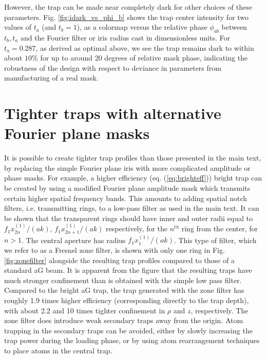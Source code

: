 However, the trap can be made near completely dark for other choices of these parameters. Fig. \ref{fig:idark_vs_phi_b} shows the trap center intensity for two values of $t_a$ (and $t_b=1$), as a colormap versus the relative phase $\phi_{ab}$ between $t_b,t_a$ and the Fourier filter or iris radius cast in dimensionless units. For $t_a=0.287$, as derived as optimal above, we see the trap remains dark to within about $10 \%$ for up to around 20 degrees of relative mask phase, indicating the robustness of the design with respect to deviance in parameters from manufacturing of a real mask.

\section{Tighter traps with alternative Fourier plane masks}\label{sec:tighter}
It is possible to create tighter trap profiles than those presented in the main text, by replacing the simple Fourier plane iris with more complicated amplitude or phase masks. For example, a higher efficiency (eq. (\ref{eq:brighteff})) bright trap can be created by using a modified Fourier plane amplitude mask which transmits certain higher spatial frequency bands. This amounts to adding spatial notch filters, i.e. transmitting rings, to a low-pass filter as used in the main text. It can be shown that the transparent rings should have inner and outer radii equal to $f_1 x_{2n}^{(1)}/(ak)$, $f_1 x_{2n+1}^{(1)}/(ak)$ respectively, for the $n^{th}$ ring from the center, for $n>1$. The central aperture has radius $f_1 x_{1}^{(1)}/(ak)$. This type of filter, which we refer to as a Fresnel zone filter, is shown with  only one ring in Fig. \ref{fig:zonefilter} alongside the resulting trap profiles compared to those of a standard aG beam. It is apparent from the figure that the resulting traps have much stronger confinement than is obtained with the simple low pass filter. Compared to the bright aG trap, the trap generated with the zone filter has roughly 1.9 times higher efficiency (corresponding directly to the trap depth), with about 2.2 and 10 times tighter confinement in $\rho$ and $z$, respectively. The zone filter does introduce weak secondary traps away from the origin. Atom trapping in the secondary traps can be avoided, either by slowly increasing the trap power during the loading phase, or by using atom rearrangement techniques to place atoms in the central trap. 

